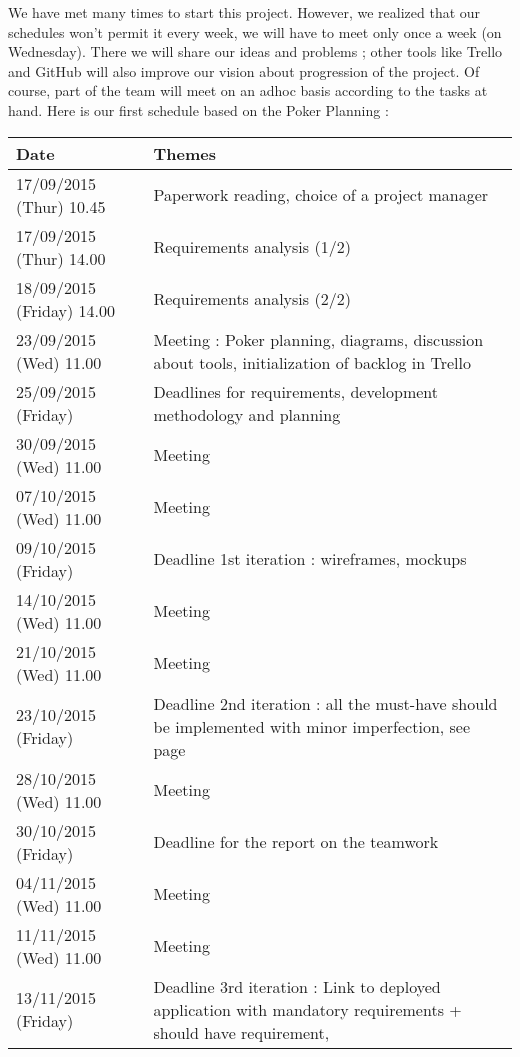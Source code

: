 We have met many times to start this project. However, we realized that our
schedules won't permit it every week, we will have to meet only once a
week (on Wednesday). There we will share our ideas and problems ;
other tools like Trello and GitHub will also improve our vision about
progression of the project. Of course, part of the team will meet on an adhoc basis according to the tasks at hand. Here is our first schedule based on
the Poker Planning : \newline

\noindent\begin{longtable}{|p{0.275\linewidth}|p{0.725\linewidth}|}
    \hline
    Date & Themes \\
    \hline
    \hline
    17/09/2015 (Thur) 10.45 & Paperwork reading, choice of a project
    manager \\
    \hline
    17/09/2015 (Thur) 14.00 & Requirements analysis (1/2) \\
    \hline
    18/09/2015 (Friday) 14.00 & Requirements analysis (2/2) \\
    \hline
    23/09/2015 (Wed) 11.00 & Meeting : Poker planning, diagrams,
    discussion about tools, initialization of backlog in Trello \\
    \hline
    25/09/2015 (Friday) & Deadlines for requirements, development methodology
    and planning \\
    \hline
    30/09/2015 (Wed) 11.00 & Meeting \\
    \hline
    07/10/2015 (Wed) 11.00 & Meeting \\
    \hline
    09/10/2015 (Friday) & Deadline 1st iteration : wireframes, mockups \\
    \hline
    14/10/2015 (Wed) 11.00 & Meeting \\
    \hline
    21/10/2015 (Wed) 11.00 & Meeting \\
    \hline
    23/10/2015 (Friday) & Deadline 2nd iteration : all the must-have
    should be implemented with minor imperfection, see
    page~\pageref{musthave} \\
    \hline
    28/10/2015 (Wed) 11.00 & Meeting \\
    \hline
    30/10/2015 (Friday) & Deadline for the report on the teamwork \\
    \hline
    04/11/2015 (Wed) 11.00 & Meeting \\
    \hline
    11/11/2015 (Wed) 11.00 & Meeting \\
    \hline
    13/11/2015 (Friday) & Deadline 3rd iteration : Link to deployed
    application with mandatory requirements + should have requirement,

\end{longtable}
